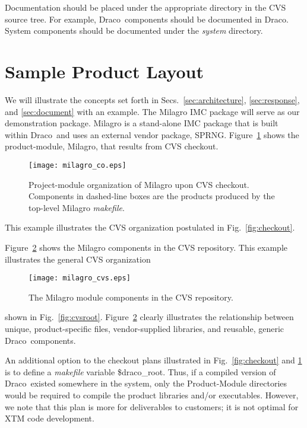 \documentclass[11pt]{rnote}
\newcommand{\draco}{\textsf{Draco}}
\newcommand{\pkg}[1]{\textsf{#1}}
\newcommand{\dir}[1]{\textsl{#1}}
\begin{document}
Documentation should  be placed under the appropriate directory in 
the CVS source tree.  For example, \draco\ components should be
documented in \draco.  \pkg{System} components should be documented
under the \dir{system} directory.


\section{Sample Product Layout}

We will illustrate the concepts set forth in
Secs.~\ref{sec:architecture}, \ref{sec:response}, and
\ref{sec:document} with an example.  The \pkg{Milagro} IMC package
will serve as our demonstration package.  \pkg{Milagro} is a
stand-alone IMC package that is built within \draco\ and uses an
external vendor package, \pkg{SPRNG}.  Figure~\ref{fig:milagro_co}
shows the product-module, \pkg{Milagro}, that results from CVS
checkout.
\begin{figure}
  \centerline{\texttt{[image: milagro\_co.eps]}}
  \caption{Project-module organization of \pkg{Milagro} upon CVS
    checkout.  Components in dashed-line boxes are the products
    produced by the top-level \pkg{Milagro} \dir{makefile}.}
  \label{fig:milagro_co}
\end{figure}
This example illustrates the CVS organization postulated in
Fig.~\ref{fig:checkout}. 

Figure~\ref{fig:milagro_cvs} shows the \pkg{Milagro} components in the 
CVS repository.  This example illustrates the general CVS organization 
\begin{figure}
  \centerline{\texttt{[image: milagro\_cvs.eps]}}
  \caption{The \pkg{Milagro} module components in the CVS repository.}
  \label{fig:milagro_cvs}
\end{figure}
shown in Fig.~\ref{fig:cvsroot}.  Figure~\ref{fig:milagro_cvs} clearly 
illustrates the relationship between unique, product-specific files,
vendor-supplied libraries, and reusable, generic \draco\ components.

An additional option to the checkout plans illustrated in
Fig.~\ref{fig:checkout} and \ref{fig:milagro_co} is to define a
\dir{makefile} variable \$draco\_root.  Thus, if a compiled version of
\draco\ existed somewhere in the system, only the \pkg{Product-Module}
directories would be required to compile the product libraries and/or
executables.  However, we note that this plan is more for deliverables
to customers; it is not optimal for XTM code development.
\end{document}
